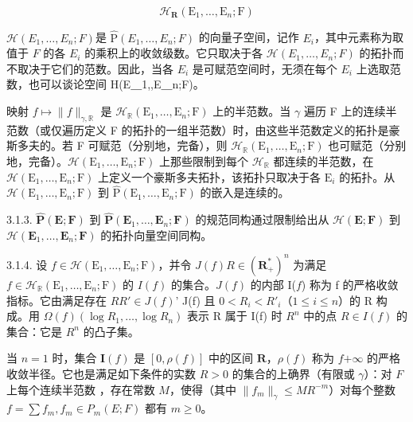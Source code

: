 \[
\mathcal {H} _ {\mathbf {R}} (\mathrm{E} _ {1}, \dots , \mathrm{E} _ {n}; \mathrm{F})
\]

\(\mathcal{H}(E_{1},\ldots,E_{n};F)\)是 \(\hat{\mathrm{P}}(E_{1},\ldots,E_{n};F)\) 的向量子空间，记作 \(E_{i}\)，其中元素称为取值于 \(F\) 的各 \(E_{i}\) 的乘积上的收敛级数。它只取决于各 \(\mathcal{H}(E_{1},\ldots,E_{n};F)\) 的拓扑而不取决于它们的范数。因此，当各 \(E_{i}\) 是可赋范空间时，无须在每个 \(E_{i}\) 上选取范数，也可以谈论空间 H(E＿1,,E＿n;F)。

映射 \(f\mapsto\|f\|_{\gamma,\mathbb{R}}\) 是 \(\mathcal{H}_{\mathbb{R}}(\mathrm{E}_{1},\ldots,\mathrm{E}_{n};\mathrm{F})\) 上的半范数。当 \(\gamma\) 遍历 F 上的连续半范数（或仅遍历定义 F 的拓扑的一组半范数）时，由这些半范数定义的拓扑是豪斯多夫的。若 F 可赋范（分别地，完备），则 \(\mathcal{H}_{\mathbb{R}}(\mathrm{E}_{1},\ldots,\mathrm{E}_{n};\mathrm{F})\) 也可赋范（分别地，完备）。\(\mathcal{H}(\mathrm{E}_{1},\ldots,\mathrm{E}_{n};\mathrm{F})\) 上那些限制到每个 \(\mathcal{H}_{\mathbb{R}}\) 都连续的半范数，在 \(\mathcal{H}(\mathrm{E}_{1},\ldots,\mathrm{E}_{n};\mathrm{F})\) 上定义一个豪斯多夫拓扑，该拓扑只取决于各 \(\mathrm{E}_{i}\) 的拓扑。从 \(\mathcal{H}(\mathrm{E}_{1},\ldots,\mathrm{E}_{n};\mathrm{F})\) 到 \(\hat{\mathrm{P}}(\mathrm{E}_{1},\ldots,\mathrm{E}_{n};\mathrm{F})\) 的嵌入是连续的。

3.1.3. \(\hat{\mathbf{P}}(\mathbf{E};\mathbf{F})\) 到 \(\hat{\mathbf{P}}(\mathbf{E}_{1},\ldots,\mathbf{E}_{n};\mathbf{F})\) 的规范同构通过限制给出从 \(\mathcal{H}(\mathbf{E};\mathbf{F})\) 到 \(\mathcal{H}(\mathbf{E}_{1},\ldots,\mathbf{E}_{n};\mathbf{F})\) 的拓扑向量空间同构。

3.1.4. 设 \(f \in \mathcal{H}(\mathrm{E}_1, \ldots, \mathrm{E}_n; \mathrm{F})\)，并令 \(J(f)\)\(R \in (\mathbf{R}_+^*)^n\) 为满足 \(f \in \mathcal{H}_{\mathbb{R}}(\mathrm{E}_1, \ldots, \mathrm{E}_n; \mathrm{F})\) 的 \(I(f)\) 的集合。\(J(f)\) 的内部 I(\(f\)) 称为 f 的严格收敛指标。它由满足存在 \(R\)\(R' \in J(f)\)'  J(f) 且 \(0 < R_i < R'_i\)（\(1 \leqslant i \leqslant n\)）的 R 构成。用 \(\Omega(f)\)\((\log R_1, \ldots, \log R_n)\) 表示 R 属于 I(f) 时 \(R^n\) 中的点 \(R \in I(f)\) 的集合：它是 \(R^n\) 的凸子集。

当 \(n=1\) 时，集合 \(\mathbf{I}(f)\) 是 \([0,\rho(f)]\) 中的区间 \(\mathbf{R}\)，\(\rho(f)\) 称为 \(f\)\(+\infty\) 的严格收敛半径。它也是满足如下条件的实数 \(R>0\) 的集合的上确界（有限或 \(\gamma\)）：对 \(F\) 上每个连续半范数 ，存在常数 \(M\)，使得（其中 \(\|f_{m}\|_{\gamma}\leqslant MR^{-m}\)）对每个整数 \(f=\sum f_{m},f_{m}\in P_{m}(E;F)\) 都有 \(m\geqslant0\)。

